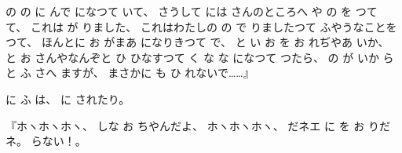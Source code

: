 %
の
の
に
んで
になつて
いて、
%
さうして
には
さんのところへ
や
の
を
つて
て、
%
これは
が
りました、
%
これはわたしの
の
で
りましたつて
ふやうなことを
つて、
%
ほんとに
お
がまあ
になりきつて
で、
%
と
い
お
を
お
れぢやあ
いか、
%
と
お
さんやなんぞと
ひ
ひなすつて
く
な
な
になつて
つたら、
%
の
が
いか
らと
ふ
さへ
ますが、
%
まさかに
も
ひ
れないで……』

に
ふ
は、
%
に
されたり。

『ホヽホヽホヽ、
%
しな
お
ちやんだよ、
%
ホヽホヽホヽ、
%
だネエ
に
を
お
りだネ。
%
らない！。

